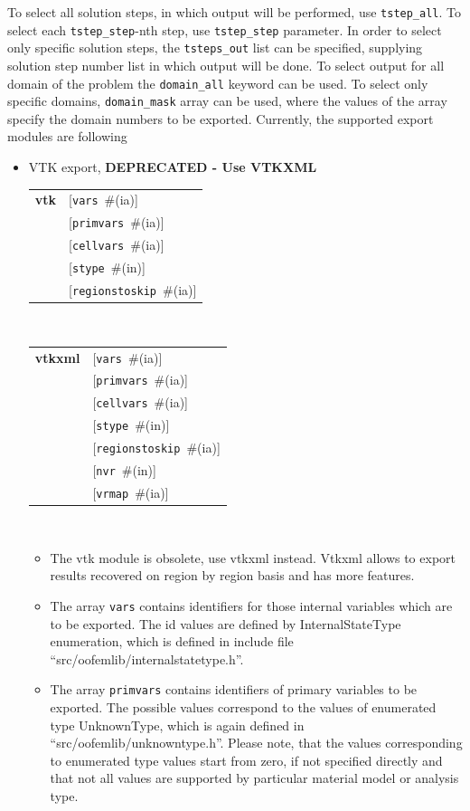 \documentclass[a4paper]{article}
\makeatletter
\newcommand{\param}[1]{\texttt{#1}} %
\newcommand{\optional}[1]{[#1]} %
\newcommand{\field}[2]{\param{#1}~\#{\tiny(#2)}} %
\newcommand{\optField}[2]{\optional{\field{#1}{#2}}}
\newcommand{\entKeywordInst}[1]{\textbf{#1}} %
\newenvironment{record}[1][]{\begin{tabular}{|ll}}{\end{tabular}\\}
\newcommand{\recentry}[2]{{#1}&{#2}\\}
\newcounter{rcc}
\newenvironment{record}[1][\textwidth]{\setcounter{rcc}{0}\begin{tabular*}{#1}{|ll@{\extracolsep{\fill}}r}}{\end{tabular*}\\}
\newcommand{\recentry}[2]{\ifthenelse{\value{rcc}>0}{&$\backslash$ \\}{\setcounter{rcc}{1}}{#1}&{#2}}
\makeatother
\begin{document}
To select all solution steps, in which output will be performed, use
\param{tstep\_all}. To select each \param{tstep\_step}-nth step, use
\param{tstep\_step} parameter. In order to select only specific
solution steps, the \param{tsteps\_out} list can be specified,
supplying solution step number list in which output will be done.
To select output for all domain of the problem the \param{domain\_all}
keyword can be used. To select only specific domains,
\param{domain\_mask} array can be used, where the values of the array
specify the domain numbers to be exported.
Currently, the supported export modules are following
\begin{itemize}
\item VTK export, \textbf{DEPRECATED - Use VTKXML}

\begin{record}[0.9\textwidth]
  \recentry{\entKeywordInst{vtk}}{\optField{vars}{ia}}
  \recentry{}{\optField{primvars}{ia}}
  \recentry{}{\optField{cellvars}{ia}}
  \recentry{}{\optField{stype}{in}}
  \recentry{}{\optField{regionstoskip}{ia}}
\end{record}


\begin{record}[0.9\textwidth]
  \recentry{\entKeywordInst{vtkxml}}{\optField{vars}{ia}}
  \recentry{}{\optField{primvars}{ia}}
  \recentry{}{\optField{cellvars}{ia}}
  \recentry{}{\optField{stype}{in}}
  \recentry{}{\optField{regionstoskip}{ia}}
  \recentry{}{\optField{nvr}{in}}
  \recentry{}{\optField{vrmap}{ia}}
\end{record}

\begin{itemize}
\item The vtk module is obsolete, use vtkxml instead. Vtkxml allows to export results recovered on region by region basis and has more features.

\item The array \param{vars} contains identifiers for those internal
variables which are to be exported. The id values are defined by
InternalStateType enumeration, which is defined in include file
``src/oofemlib/internal\-statetype.h''.

\item The array \param{primvars}
contains identifiers of primary variables to be exported.
The possible values correspond to the values of enumerated type
UnknownType, which is again defined in ``src/oofemlib/unknown\-type.h''.
Please note, that the values corresponding to enumerated type values
start from zero, if not specified directly and that not all values are
supported by particular material model or analysis type.


\end{itemize}
\end{itemize}
\end{document}

